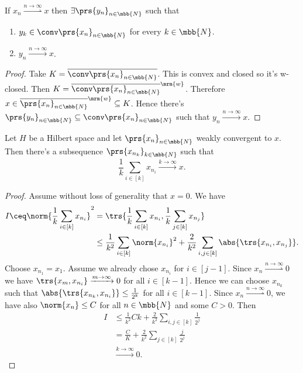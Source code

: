 \documentclass[10pt, twoside]{book}
\begin{document}
\begin{corollary}[Mazur]
If $x_n \overset{n\to\infty}{\rightharpoonup} x$ then $\exists \prs{y_n}_{n \in \mbb{N}}$ such that
\begin{enumerate}
\item $y_k \in \conv\prs{x_n}_{n \in \mbb{N}}$ for every $k \in \mbb{N}$.
\item $y_n \xrightarrow{n\to\infty} x$.
\end{enumerate}
\end{corollary}

\begin{proof}
Take $K = \overline{\conv\prs{x_n}_{n \in \mbb{N}}}$. This is convex and closed so it's w-closed. Then $K = \overline{\conv\prs{x_n}_{n \in \mbb{N}}}^{\mrm{w}}$. Therefore $x \in \overline{\prs{x_n}_{n \in \mbb{N}}}^{\mrm{w}} \subseteq K$. Hence there's $\prs{y_n}_{n \in \mbb{N}} \subseteq \conv\prs{x_n}_{n \in \mbb{N}}$ such that $y_n \xrightarrow{n\to\infty} x$.
\end{proof}

\begin{theorem}\label{theorem:banach_saks_1}
Let $H$ be a Hilbert space and let $\prs{x_n}_{n \in \mbb{N}}$ weakly convergent to $x$. Then there's a subsequence $\prs{x_{n_k}}_{k \in \mbb{N}}$ such that
\[\frac{1}{k} \sum_{i \in [k]} x_{n_i} \xrightarrow{k\to\infty} x \text{.}\]
\end{theorem}

\begin{proof}
Assume without loss of generality that $x = 0$.
We have
\begin{align*}
I \ceq \norm{\frac{1}{k} \sum_{i \in [k]} x_{n_i}}^2 &= \trs{\frac{1}{k} \sum_{i \in [k]} x_{n_i}, \frac{1}{k} \sum_{j \in [k]} x_{n_j}}
\\&\leq \frac{1}{k^2} \sum_{i \in [k]} \norm{x_{n_i}}^2 + \frac{2}{k^2} \sum_{i,j \in [k]} \abs{\trs{x_{n_i}, x_{n_j}}} \text{.}
\end{align*}
Choose $x_{n_1} = x_1$. Assume we already chose $x_{n_i}$ for $i \in [j-1]$. Since $x_n \overset{n\to\infty}{\rightharpoonup} 0$ we have $\trs{x_m, x_{n_i}} \xrightarrow{m\to\infty} 0$ for all $i \in [k-1]$. Hence we can choose $x_{n_k}$ such that $\abs{\trs{x_{n_k}, x_{n_i}}} \leq \frac{1}{2^k}$ for all $i \in [k-1]$. Since $x_n \overset{n\to\infty}{\rightharpoonup} 0$, we have also $\norm{x_n} \leq C$ for all $n \in \mbb{N}$ and some $C > 0$.
Then
\begin{align*}
I &\leq \frac{1}{k^2} C k + \frac{2}{k^2} \sum_{i,j \in [k]} \frac{1}{2^j}
\\&= \frac{C}{K} + \frac{2}{k^2} \sum_{j \in [k]} \frac{j}{2^j}
\\&\xrightarrow{k\to\infty} 0 \text{.}
\end{align*}
\end{proof}
\end{document}
